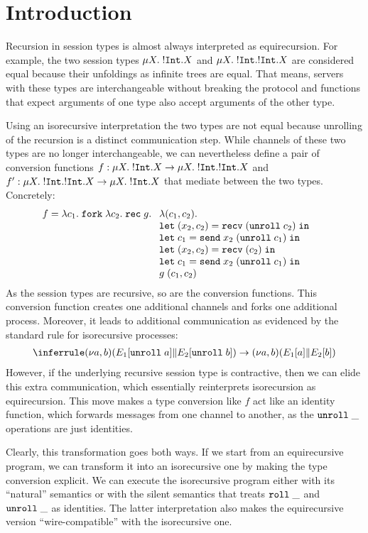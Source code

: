 
\section{Introduction}
\label{sec:introduction}

Recursion in session types is almost always interpreted as
equirecursion. For example, the two session types $\mu X.\;{{}!\mathtt{Int}.X} $
and $\mu X.\;{{}!\mathtt{Int}.{}!\mathtt{Int}.X} $ are considered equal because
their unfoldings as infinite trees are equal. That means, servers with
these types are interchangeable without breaking the protocol and
functions that expect arguments of one type also accept arguments of
the other type.

Using an isorecursive interpretation the two types are not equal
because unrolling of the recursion is a distinct communication
step. While channels of these two types are no longer
interchangeable, we can nevertheless define a pair of conversion
functions
$f : \mu X.\;{{}!\mathtt{Int}.X} \rightarrow \mu X.\;{{}!\mathtt{Int}.{}!\mathtt{Int}.X}$
and
$f' : \mu X.\;{{}!\mathtt{Int}.{}!\mathtt{Int}.X} \rightarrow \mu X.\;{{}!\mathtt{Int}.X}$
that mediate between the two types. Concretely:
\begin{align*}
  f &=       \ELam {c_1} \EFork{ \ELam {c_2} \ERec g %
      \begin{array}[t]{l}
      \ELam{(c_1, c_2)} \\
      \ELet{(x_2,c_2)}{\ERecv{(\EUnroll{c_2})}} \\
      \ELet{c_1}{\ESend{x_2}{(\EUnroll{c_1})}} \\
      \ELet{(x_2,c_2)}{\ERecv{({c_2})}} \\
      \ELet{c_1}{\ESend{x_2}{(\EUnroll{c_1})}} \\
        g \; ({c_1}, {c_2}) %
      \end{array}}
\end{align*}
As the session types are recursive, so are the conversion
functions. This conversion function creates one additional
channels and forks one additional process. Moreover, it leads to
additional communication as evidenced by the standard rule for
isorecursive processes:
\begin{gather*}
  \reducerule{
    \PScope (\PPar* {\EUnroll a} {\EUnroll b})
  }{
    \PScope (\PPar* a b)
  }
\end{gather*}
However, if the underlying recursive session type is contractive, then we can
elide this extra communication, which essentially reinterprets
isorecursion as equirecursion.
This move makes a type conversion like $f$ act like an identity
function, which forwards messages from one channel to another, as the
$\mathtt{unroll}\; \_$ operations are just identities. 


Clearly, this transformation goes both ways. If we start from an
equirecursive program, we can transform it into an isorecursive one by
making the type conversion explicit. We can execute the isorecursive
program either with its ``natural'' semantics or with the silent
semantics that treats $\mathtt{roll}\; \_$ and $\mathtt{unroll}\; \_$ as identities.
The latter interpretation also makes the equirecursive version
``wire-compatible'' with the isorecursive one.


  

